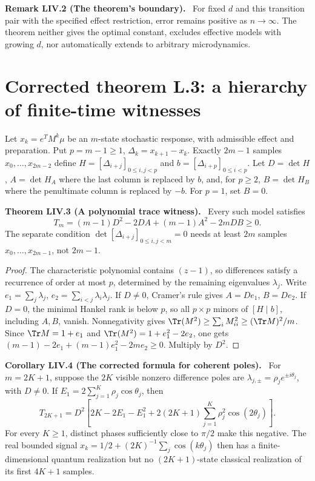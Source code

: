 \documentclass[11pt,a4paper,oneside]{book}
\newcommand{\statement}[3]{\par\medskip\noindent\textbf{#1 #2 (#3).}\ }
\begin{document}
\statement{Remark}{LIV.2}{The theorem's boundary}
For fixed $d$ and this transition pair with the specified effect restriction, error remains positive as $n\to\infty$. The theorem neither gives the optimal constant, excludes effective models with growing $d$, nor automatically extends to arbitrary microdynamics.
\section{Corrected theorem L.3: a hierarchy of finite-time witnesses}
Let $x_k=e^TM^k\mu$ be an $m$-state stochastic response, with admissible effect and preparation. Put $p=m-1\ge1$, $\Delta_k=x_{k+1}-x_k$. Exactly $2m-1$ samples $x_0,\ldots,x_{2m-2}$ define $H=[\Delta_{i+j}]_{0\le i,j<p}$ and $b=[\Delta_{i+p}]_{0\le i<p}$. Let $D=\det H$, $A=\det H_A$ where the last column is replaced by $b$, and, for $p\ge2$, $B=\det H_B$ where the penultimate column is replaced by $-b$. For $p=1$, set $B=0$.
\statement{Theorem}{LIV.3}{A polynomial trace witness}
Every such model satisfies
\begin{equation}T_m=(m-1)D^2-2DA+(m-1)A^2-2mDB\ge0.\tag{317}\end{equation}
The separate condition $\det[\Delta_{i+j}]_{0\le i,j<m}=0$ needs at least $2m$ samples $x_0,\ldots,x_{2m-1}$, not $2m-1$.
\begin{proof}
The characteristic polynomial contains $(z-1)$, so differences satisfy a recurrence of order at most $p$, determined by the remaining eigenvalues $\lambda_j$. Write $e_1=\sum_j\lambda_j$, $e_2=\sum_{i<j}\lambda_i\lambda_j$. If $D\ne0$, Cramer's rule gives $A=De_1$, $B=De_2$. If $D=0$, the minimal Hankel rank is below $p$, so all $p\times p$ minors of $[H\mid b]$, including $A,B$, vanish. Nonnegativity gives $\Tr(M^2)\ge\sum_iM_{ii}^2\ge(\Tr M)^2/m$. Since $\Tr M=1+e_1$ and $\Tr(M^2)=1+e_1^2-2e_2$, one gets $(m-1)-2e_1+(m-1)e_1^2-2me_2\ge0$. Multiply by $D^2$.
\end{proof}
\statement{Corollary}{LIV.4}{The corrected formula for coherent poles}
For $m=2K+1$, suppose the $2K$ visible nonzero difference poles are $\lambda_{j,\pm}=\rho_je^{\pm i\theta_j}$, with $D\ne0$. If $E_1=2\sum_{j=1}^K\rho_j\cos\theta_j$, then
\begin{equation}T_{2K+1}=D^2\left[2K-2E_1-E_1^2+2(2K+1)\sum_{j=1}^K\rho_j^2\cos(2\theta_j)\right].\tag{318}\end{equation}
For every $K\ge1$, distinct phases sufficiently close to $\pi/2$ make this negative. The real bounded signal $x_k=1/2+(2K)^{-1}\sum_j\cos(k\theta_j)$ then has a finite-dimensional quantum realization but no $(2K+1)$-state classical realization of its first $4K+1$ samples.
\end{document}
